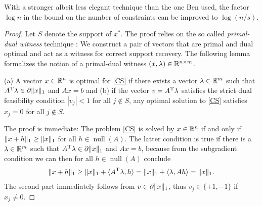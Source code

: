 \documentclass{article} %
\renewcommand{\null}{\operatorname{null}}
\begin{document}
With a stronger albeit less elegant technique than the one Ben used, the factor $\log n$ in the bound on the number of constraints can be improved to $\log(n/s)$.
\begin{proof}
Let $S$ denote the support of $x^*$. The proof relies on the so called \emph{primal-dual witness} technique \cite{Wainwright2009}: We construct a pair of vectors that are primal and dual optimal and act as a witness for correct support recovery.
The following lemma formalizes the notion of a primal-dual witness $(x, \lambda)\in \mathbb{R}^{n\times m}$.
\begin{lemma}\label{l1-lemma}
  (a) A vector $x \in \mathbb{R}^n$ is optimal for \eqref{CS} if there exists
  a vector $\lambda\in \mathbb{R}^m$ such that $A^{\rm T} \lambda\in \partial
  \lVert x\rVert_1$ and $Ax = b$ and (b) if the vector $v = A^{\rm T} \lambda$
  satisfies the strict dual feasibility condition $|v_j| < 1$
  for all $j\not\in S$, any optimal solution to \eqref{CS} satisfies
  $x_j = 0$ for all $j\not\in S$.
\end{lemma}
The proof is immediate: The problem \eqref{CS} is solved by $x\in
\mathbb{R}^n$ if and only if $\lVert x + h\rVert_1 \geq \lVert x\rVert_1$ for all $h\in \null(A)$.
The latter condition is true if there is a $\lambda \in \mathbb{R}^m$ such
that $A^{\rm T} \lambda \in \partial \lVert x\rVert_1$ and $Ax = b$, because from
the subgradient condition we can then for all $h\in \null(A)$ conclude
\begin{equation*}
\lVert x + h\rVert_1 \geq \lVert x\rVert_1 + \langle A^{\rm T} \lambda, h\rangle = \lVert x\rVert_1 +
  \langle\lambda, A h\rangle = \lVert x\rVert_1.
\end{equation*}
The second part immediately follows from $v \in \partial\lVert x\rVert_1$,
thus $v_j \in \{+1, -1\}$ if $x_j \neq 0$. \qedhere


\end{proof}
\end{document}
